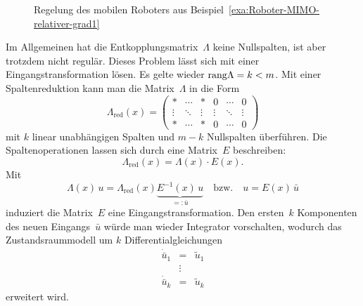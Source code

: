 \begin{figure}
\begin{centering}
\resizebox{0.75\textwidth}{!}{}
\par\end{centering}
\caption{Regelung des mobilen Roboters aus Beispiel~\ref{exa:Roboter-MIMO-relativer-grad1}\label{fig:roboter-MIMO-dyn1}}

\end{figure}

Im Allgemeinen hat die Entkopplungsmatrix~$\Lambda$ keine Nullspalten,
ist aber trotzdem nicht regulär. Dieses Problem lässt sich mit einer
Eingangstransformation lösen. Es gelte wieder ${\operatorname{rang}}\Lambda=k<m$.
Mit einer Spaltenreduktion kann man die Matrix~$\Lambda$ in die
Form 
\begin{equation}
\Lambda_{\text{red}}(x)=\left(\begin{array}{ccc|ccc}
* & \cdots & * & 0 & \cdots & 0\\
\vdots & \ddots & \vdots & \vdots & \ddots & \vdots\\
* & \cdots & * & 0 & \cdots & 0
\end{array}\right)\label{eq:Lambda-red}
\end{equation}
mit $k$ linear unabhängigen Spalten und $m-k$ Nullspalten überführen.
Die Spaltenoperationen lassen sich durch eine Matrix~$E$ beschreiben:
\[
\Lambda_{\text{red}}(x)=\Lambda(x)\cdot E(x).
\]
Mit 
\[
\Lambda(x)\,u=\Lambda_{\text{red}}(x)\underbrace{E^{-1}(x)\,u}_{{\displaystyle =:\bar{u}}}\quad\text{bzw.}\quad u=E(x)\,\bar{u}
\]
induziert die Matrix~$E$ eine Eingangstransformation. Den ersten~$k$
Komponenten des neuen Eingangs~$\bar{u}$ würde man wieder Integrator
vorschalten, wodurch das Zustandsraummodell um $k$ Differentialgleichungen
\begin{equation}
\begin{array}{lcl}
\dot{\bar{u}}_{1} & = & \tilde{u}_{1}\\
 & \vdots\\
\dot{\bar{u}}_{k} & = & \tilde{u}_{k}
\end{array}\label{eq:dynamische-Erweiterung2}
\end{equation}
erweitert wird.

